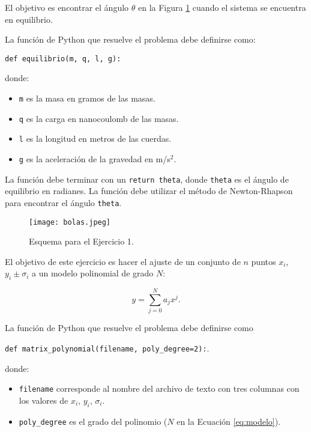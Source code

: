 \documentclass[11pt,letterpaper]{exam}
\begin{document}
\vspace{0.3cm}
\begin{questions}





El objetivo es encontrar el \'angulo $\theta$ en la Figura
\ref{fig:uno} cuando el sistema se encuentra en equilibrio.  

La funci\'on de Python que resuelve el problema debe definirse como:

\verb"def equilibrio(m, q, l, g):"

donde:
\begin{itemize}
\item\verb"m" es la masa en gramos de las masas.
\item\verb"q" es la carga en nanocoulomb de las masas.
\item\verb"l" es la longitud en metros de las cuerdas.
\item\verb"g" es la aceleraci\'on de la gravedad en m/s$^2$.
\end{itemize}

La funci\'on debe terminar con un \verb"return theta", donde
\verb"theta" es el \'angulo de equilibrio en radianes.
La funci\'on debe utilizar el m\'etodo de Newton-Rhapson para
encontrar el \'angulo \verb"theta".


\begin{figure}[h]
\begin{center}
\texttt{[image: bolas.jpeg]}
\end{center}
\caption{Esquema para el Ejercicio 1.}
\label{fig:uno}
\end{figure}




El objetivo de este ejercicio es hacer el ajuste de un conjunto de $n$
puntos $x_i$, $y_i\pm \sigma_i$ a un modelo polinomial de grado $N$:

\begin{equation}
y = \sum_{j=0}^{N}a_j x^{j}.
\label{eq:modelo}
\end{equation}

La funci\'on de Python que resuelve el problema debe definirse como 


\verb"def matrix_polynomial(filename, poly_degree=2):".  

donde:

\begin{itemize}
\item \verb"filename" corresponde al nombre del archivo de texto con
  tres columnas con los valores de $x_i$, $y_i$, $\sigma_i$.
\item \verb"poly_degree" es el grado del polinomio ($N$ en
  la Ecuaci\'on \ref{eq:modelo}).
\end{itemize}


\end{questions}
\end{document}
